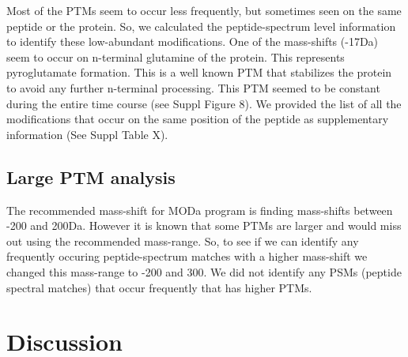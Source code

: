 \documentclass[12pt]{article}
\begin{document}
Most of the PTMs seem to occur less frequently, but sometimes seen on the same peptide or the protein. So, we calculated the peptide-spectrum level information to identify these low-abundant modifications. One of the mass-shifts (-17Da) seem to occur on n-terminal glutamine of the protein. This represents pyroglutamate formation. This is a well known PTM that stabilizes the protein to avoid any further n-terminal processing. This PTM seemed to be constant during the entire time course (see Suppl Figure 8). We provided the list of all the modifications that occur on the same position of the peptide as supplementary information (See Suppl Table X).

\subsection{Large PTM analysis}



The recommended mass-shift for MODa program is finding mass-shifts between -200 and 200Da. However it is known that some PTMs are larger and would miss out using the recommended mass-range. So, to see if we can identify any frequently occuring peptide-spectrum matches with a higher mass-shift we changed this mass-range to -200 and 300. We did not identify any PSMs (peptide spectral matches) that occur frequently that has higher PTMs. 



\section{Discussion}
\end{document}
